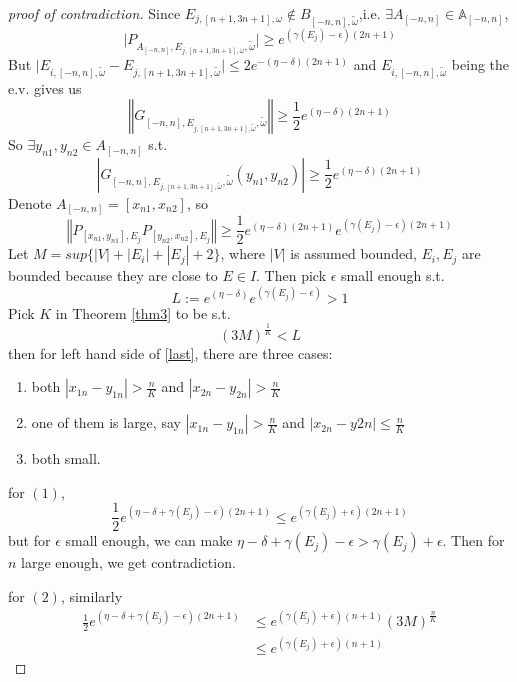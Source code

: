\begin{proof}[proof of contradiction]
Since $E_{j,[n+1,3n+1],\omega}\notin B_{[-n,n],\tilde{\omega}}$,i.e.
$\exists A_{[-n,n]}\in\mathbb{A}_{[-n,n]}$,
\[
\vert P_{A_{[-n,n]},E_{j,[n+1,3n+1],\omega},\tilde{\omega}}\vert\geq e^{(\gamma(E_j)-\epsilon)(2n+1)}
\]
But $\vert E_{i,[-n,n],\tilde{\omega}}-E_{j,[n+1,3n+1],\tilde{\omega}}\vert\leq 2e^{-(\eta-\delta)(2n+1)}$ and $E_{i,[-n,n],\tilde{\omega}}$ being the e.v. gives us
\[
  \left\Vert G_{[-n,n],E_{j,[n+1,3n+1],\tilde{\omega}},\tilde{\omega}}\right\Vert\geq \frac{1}{2}e^{(\eta-\delta)(2n+1)}
\]
So $\exists y_{n1},y_{n2}\in A_{[-n,n]}$ s.t.
\[
  \left\vert G_{[-n,n],E_{j,[n+1,3n+1],\tilde{\omega}},\tilde{\omega}}(y_{n1},y_{n2})\right\vert\geq \frac{1}{2}e^{(\eta-\delta)(2n+1)}
\]
Denote $A_{[-n,n]}=[x_{n1},x_{n2}]$, so
\begin{equation}\label{last}
  \left\Vert P_{[x_{n1},y_{n1}],E_j}P_{[y_{n2},x_{n2}],E_j}\right\Vert\geq\frac{1}{2}e^{(\eta-\delta)(2n+1)}e^{(\gamma(E_j)-\epsilon)(2n+1)}
\end{equation}
Let $M= sup\{|V|+|E_i|+|E_j|+2\}$, where $|V|$ is assumed bounded, $E_i,E_j$ are bounded because they are close to $E\in I$. Then pick $\epsilon$ small enough s.t.
  \[L:=e^{(\eta-\delta)}e^{(\gamma(E_j)-\epsilon)}>1\]
Pick $K$ in Theorem \ref{thm3} to be s.t.
  \[(3M)^{\frac{1}{K}}<L\]
then for left hand side of \ref{last}, there are three cases:
\begin{enumerate}
  \item both $|x_{1n}-y_{1n}|>\frac{n}{K}$ and $|x_{2n}-y_{2n}|>\frac{n}{K}$
  \item one of them is large, say $|x_{1n}-y_{1n}|>\frac{n}{K}$ and $|x_{2n}-y{2n}|\leq\frac{n}{K}$
  \item both small.
\end{enumerate}

for $(1)$,
\[
\frac{1}{2}e^{(\eta-\delta+\gamma(E_j)-\epsilon)(2n+1)}\leq e^{(\gamma(E_j)+\epsilon)(2n+1)}
\]
but for $\epsilon$ small enough, we can make $\eta-\delta+\gamma(E_j)-\epsilon>\gamma(E_j)+\epsilon$. Then for $n$ large enough, we get contradiction.

for $(2)$, similarly
\[
  \begin{aligned}
    \frac{1}{2}e^{(\eta-\delta+\gamma(E_j)-\epsilon)(2n+1)}
    &\leq e^{(\gamma(E_j)+\epsilon)(n+1)}(3M)^{\frac{n}{K}}\\
    &\leq e^{(\gamma(E_j)+\epsilon)(n+1)}
  \end{aligned}
\]
\end{proof}
